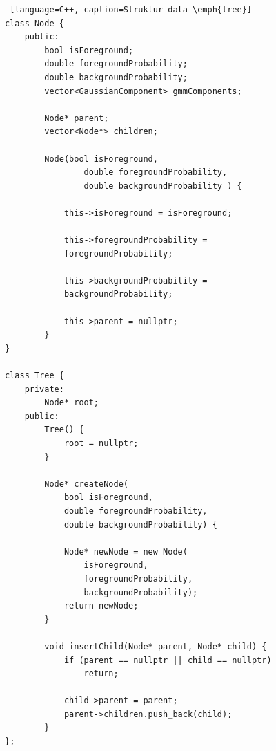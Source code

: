 \begin{lstlisting} [language=C++, caption=Struktur data \emph{tree}]
class Node {
    public:
        bool isForeground;
        double foregroundProbability;
        double backgroundProbability;
        vector<GaussianComponent> gmmComponents;

        Node* parent;
        vector<Node*> children;

        Node(bool isForeground, 
                double foregroundProbability, 
                double backgroundProbability ) {

            this->isForeground = isForeground;

            this->foregroundProbability = 
			foregroundProbability;

            this->backgroundProbability = 
			backgroundProbability;

            this->parent = nullptr;
        }
}

class Tree {
    private:
        Node* root;
    public:
        Tree() {
            root = nullptr;
        }

        Node* createNode(
            bool isForeground, 
            double foregroundProbability, 
            double backgroundProbability) {

            Node* newNode = new Node(
                isForeground, 
                foregroundProbability, 
                backgroundProbability);
            return newNode;
        }

        void insertChild(Node* parent, Node* child) {
            if (parent == nullptr || child == nullptr)
                return;

            child->parent = parent;
            parent->children.push_back(child);
        }
};

\end{lstlisting}





